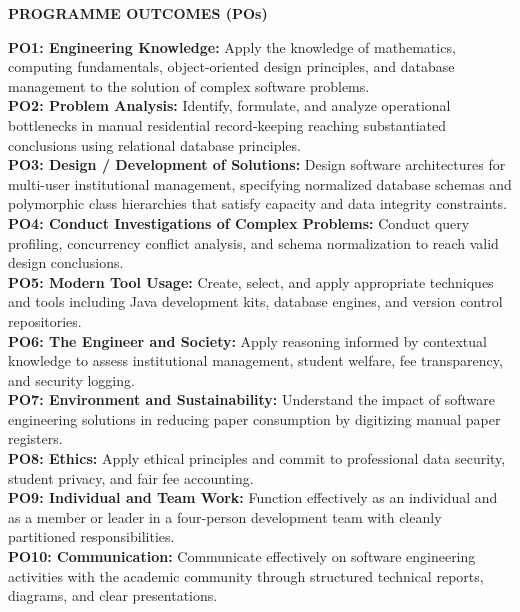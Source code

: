 \documentclass[12pt,a4paper]{report}
\begin{document}
\newpage

\begin{center}
{\Large \textbf{PROGRAMME OUTCOMES (POs)}\par}
\end{center}
\vspace{0.3cm}

\noindent \textbf{PO1: Engineering Knowledge:} Apply the knowledge of mathematics, computing fundamentals, object-oriented design principles, and database management to the solution of complex software problems.\\[0.2cm]
\noindent \textbf{PO2: Problem Analysis:} Identify, formulate, and analyze operational bottlenecks in manual residential record-keeping reaching substantiated conclusions using relational database principles.\\[0.2cm]
\noindent \textbf{PO3: Design / Development of Solutions:} Design software architectures for multi-user institutional management, specifying normalized database schemas and polymorphic class hierarchies that satisfy capacity and data integrity constraints.\\[0.2cm]
\noindent \textbf{PO4: Conduct Investigations of Complex Problems:} Conduct query profiling, concurrency conflict analysis, and schema normalization to reach valid design conclusions.\\[0.2cm]
\noindent \textbf{PO5: Modern Tool Usage:} Create, select, and apply appropriate techniques and tools including Java development kits, database engines, and version control repositories.\\[0.2cm]
\noindent \textbf{PO6: The Engineer and Society:} Apply reasoning informed by contextual knowledge to assess institutional management, student welfare, fee transparency, and security logging.\\[0.2cm]
\noindent \textbf{PO7: Environment and Sustainability:} Understand the impact of software engineering solutions in reducing paper consumption by digitizing manual paper registers.\\[0.2cm]
\noindent \textbf{PO8: Ethics:} Apply ethical principles and commit to professional data security, student privacy, and fair fee accounting.\\[0.2cm]
\noindent \textbf{PO9: Individual and Team Work:} Function effectively as an individual and as a member or leader in a four-person development team with cleanly partitioned responsibilities.\\[0.2cm]
\noindent \textbf{PO10: Communication:} Communicate effectively on software engineering activities with the academic community through structured technical reports, diagrams, and clear presentations.
\end{document}
